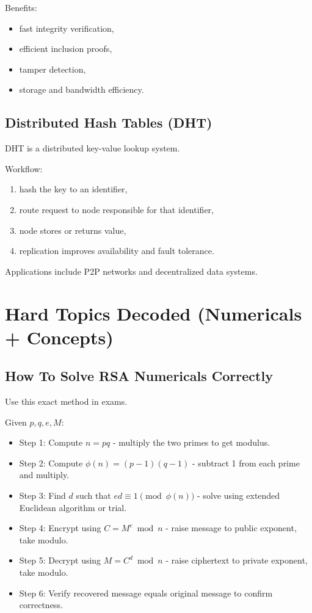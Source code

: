 \documentclass[12pt,a4paper]{article}
\begin{document}
Benefits:
\begin{itemize}
\item fast integrity verification,
\item efficient inclusion proofs,
\item tamper detection,
\item storage and bandwidth efficiency.
\end{itemize}

\subsection{Distributed Hash Tables (DHT)}
DHT is a distributed key-value lookup system.

Workflow:
\begin{enumerate}
\item hash the key to an identifier,
\item route request to node responsible for that identifier,
\item node stores or returns value,
\item replication improves availability and fault tolerance.
\end{enumerate}

Applications include P2P networks and decentralized data systems.

\section{Hard Topics Decoded (Numericals + Concepts)}

\subsection{How To Solve RSA Numericals Correctly}
Use this exact method in exams.

Given \(p,q,e,M\):
\begin{itemize}
\item Step 1: Compute \(n=pq\) - multiply the two primes to get modulus.
\item Step 2: Compute \(\phi(n)=(p-1)(q-1)\) - subtract 1 from each prime and multiply.
\item Step 3: Find \(d\) such that \(ed \equiv 1 \pmod{\phi(n)}\) - solve using extended Euclidean algorithm or trial.
\item Step 4: Encrypt using \(C=M^e \bmod n\) - raise message to public exponent, take modulo.
\item Step 5: Decrypt using \(M=C^d \bmod n\) - raise ciphertext to private exponent, take modulo.
\item Step 6: Verify recovered message equals original message to confirm correctness.
\end{itemize}
\end{document}
